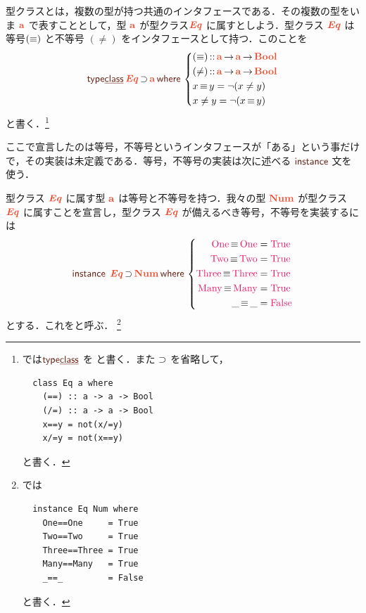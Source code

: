 \documentclass[a5paper,twoside,fleqn,draft]{jsbook}
\begin{document}
型クラスとは，複数の型が持つ共通のインタフェースである．その複数の型をいま $\mA$ で表すこととして，型 $\mA$ が型クラス$\mEqTypeClass$ に属すとしよう．型クラス $\mEqTypeClass$ は等号$(\operatorname{\equiv})$ と不等号 $(\neq)$ をインタフェースとして持つ．このことを
\begin{equation}
  \mTypeClassDecl\mathop{\mEqTypeClass}\mSuperSet\mA\mWhere{}
  \left\{
  \begin{aligned}
    &(\hIfEq)\mIn\mProjEXP{\mA }{\mProjEXP{\mA }{\mBoolType}}\\
    &(\neq)\mIn\mProjEXP{\mA }{\mProjEXP{\mA }{\mBoolType}}\\
    &x\hIfEq y=\neg(x\neq y)\\
    &x\neq y=\neg(x\hIfEq y)
  \end{aligned}
  \right.
\end{equation}
と書く．\footnote{\haskell では$\mTypeClassDecl$ を  と書く．また $\operatorname{\supset}$ を省略して，
\begin{verbatim}
  class Eq a where
    (==) :: a -> a -> Bool
    (/=) :: a -> a -> Bool
    x==y = not(x/=y)
    x/=y = not(x==y)
\end{verbatim}
と書く．}


ここで宣言したのは等号，不等号というインタフェースが「ある」という事だけで，その実装は未定義である．等号，不等号の実装は次に述べる $\mInstanceDecl$ 文を使う．

型クラス $\mEqTypeClass$ に属す型 $\mA $ は等号と不等号を持つ．我々の型 $\mType{Num}$ が型クラス $\mEqTypeClass$ に属すことを宣言し，型クラス $\mEqTypeClass$ が備えるべき等号，不等号を実装するには
\begin{equation}
  \mInstanceDecl\;\mEqTypeClass\mSuperSet\mType{Num}
  \mWhere{}
  \left\{
  \begin{aligned}
    \mNumOne\hIfEq\mNumOne&=\hTrue\\
    \mNumTwo\hIfEq\mNumTwo&=\hTrue\\
    \mNumThree\hIfEq\mNumThree&=\hTrue\\
    \mNumMany\hIfEq\mNumMany&=\hTrue\\
    \_\hIfEq\_&=\hFalse
  \end{aligned}
  \right.
\end{equation}
とする．これをと呼ぶ．
\footnote{\haskell では
\begin{verbatim}
  instance Eq Num where
    One==One     = True
    Two==Two     = True
    Three==Three = True
    Many==Many   = True
    _==_         = False
\end{verbatim}
と書く．}
\end{document}
